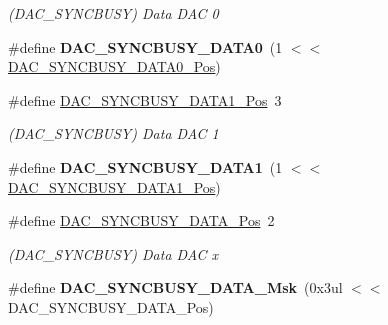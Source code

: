 \begin{DoxyCompactItemize}
\begin{DoxyCompactList}\small\item\em (D\+A\+C\+\_\+\+S\+Y\+N\+C\+B\+U\+S\+Y) Data D\+A\+C 0 \end{DoxyCompactList}\item 
\hypertarget{group___s_a_m_l21___d_a_c_ga00c7794fe3810e0ca47451c0065e953c}{}\#define {\bfseries D\+A\+C\+\_\+\+S\+Y\+N\+C\+B\+U\+S\+Y\+\_\+\+D\+A\+T\+A0}~(1 $<$$<$ \hyperlink{group___s_a_m_l21___d_a_c_ga9f415827b3ff10d6dcff38f9e03d2dd3}{D\+A\+C\+\_\+\+S\+Y\+N\+C\+B\+U\+S\+Y\+\_\+\+D\+A\+T\+A0\+\_\+\+Pos})\label{group___s_a_m_l21___d_a_c_ga00c7794fe3810e0ca47451c0065e953c}

\item 
\hypertarget{group___s_a_m_l21___d_a_c_ga42acf2c6875f6e0d2ab1997ac3cf71cd}{}\#define \hyperlink{group___s_a_m_l21___d_a_c_ga42acf2c6875f6e0d2ab1997ac3cf71cd}{D\+A\+C\+\_\+\+S\+Y\+N\+C\+B\+U\+S\+Y\+\_\+\+D\+A\+T\+A1\+\_\+\+Pos}~3\label{group___s_a_m_l21___d_a_c_ga42acf2c6875f6e0d2ab1997ac3cf71cd}

\begin{DoxyCompactList}\small\item\em (D\+A\+C\+\_\+\+S\+Y\+N\+C\+B\+U\+S\+Y) Data D\+A\+C 1 \end{DoxyCompactList}\item 
\hypertarget{group___s_a_m_l21___d_a_c_ga88f8fc5d398b0029f8ca24c3ed8dcddc}{}\#define {\bfseries D\+A\+C\+\_\+\+S\+Y\+N\+C\+B\+U\+S\+Y\+\_\+\+D\+A\+T\+A1}~(1 $<$$<$ \hyperlink{group___s_a_m_l21___d_a_c_ga42acf2c6875f6e0d2ab1997ac3cf71cd}{D\+A\+C\+\_\+\+S\+Y\+N\+C\+B\+U\+S\+Y\+\_\+\+D\+A\+T\+A1\+\_\+\+Pos})\label{group___s_a_m_l21___d_a_c_ga88f8fc5d398b0029f8ca24c3ed8dcddc}

\item 
\hypertarget{group___s_a_m_l21___d_a_c_ga2c7fa799e63254f6fe31997f8d74ab69}{}\#define \hyperlink{group___s_a_m_l21___d_a_c_ga2c7fa799e63254f6fe31997f8d74ab69}{D\+A\+C\+\_\+\+S\+Y\+N\+C\+B\+U\+S\+Y\+\_\+\+D\+A\+T\+A\+\_\+\+Pos}~2\label{group___s_a_m_l21___d_a_c_ga2c7fa799e63254f6fe31997f8d74ab69}

\begin{DoxyCompactList}\small\item\em (D\+A\+C\+\_\+\+S\+Y\+N\+C\+B\+U\+S\+Y) Data D\+A\+C x \end{DoxyCompactList}\item 
\hypertarget{group___s_a_m_l21___d_a_c_gac390d63404b6e3bf5013b0b92d867623}{}\#define {\bfseries D\+A\+C\+\_\+\+S\+Y\+N\+C\+B\+U\+S\+Y\+\_\+\+D\+A\+T\+A\+\_\+\+Msk}~(0x3ul $<$$<$ D\+A\+C\+\_\+\+S\+Y\+N\+C\+B\+U\+S\+Y\+\_\+\+D\+A\+T\+A\+\_\+\+Pos)\label{group___s_a_m_l21___d_a_c_gac390d63404b6e3bf5013b0b92d867623}


\end{DoxyCompactItemize}
